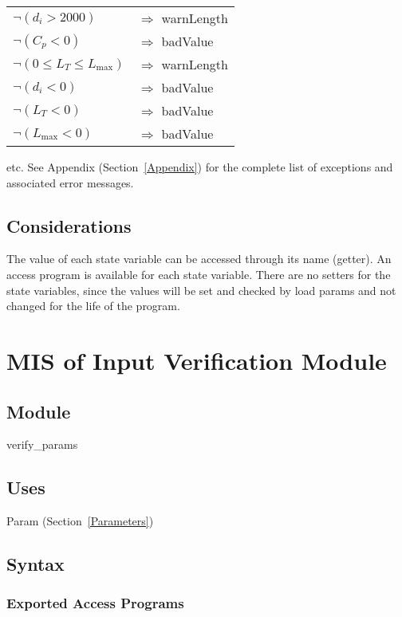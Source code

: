 \documentclass[12pt, titlepage]{article}
\begin{document}
\noindent \begin{longtable*}[l]{l l} 

$\neg (d_i > 2000)$ & $\Rightarrow$ warnLength\\
$\neg (C_p < 0)$ & $\Rightarrow$ badValue\\
$\neg (0 \leq L_T \leq L_\text{max})$ & $\Rightarrow$ warnLength\\
$\neg (d_i < 0)$ & $\Rightarrow$ badValue\\
$\neg (L_T < 0)$ & $\Rightarrow$ badValue\\
$\neg (L_\text{max} < 0)$ & $\Rightarrow$ badValue\\
\end{longtable*}

etc.  See Appendix (Section~\ref{Appendix}) for the complete list of exceptions and
associated error messages.

\subsection{Considerations}

The value of each state variable can be accessed through its name (getter).  An
access program is available for each state variable.  There are no setters for
the state variables, since the values will be set and checked by load params and
not changed for the life of the program.

\newpage

 \section{MIS of Input Verification Module} \label{VerifyInput}

 \subsection{Module}

 verify\_params

 \subsection{Uses}

 Param (Section~\ref{Parameters})

 \subsection{Syntax}

 \subsubsection{Exported Access Programs}
\end{document}
